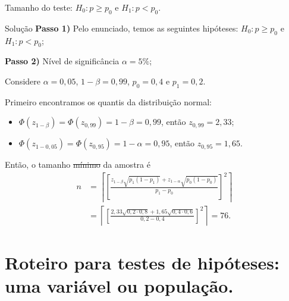 \documentclass[8pt]{beamer}
\begin{document}
\begin{frame}{Tamanho do teste: $H_0: p \geq p_0$ e $H_1: p < p_0$.}

\begin{block}{Solução}
	\textbf{Passo 1)}  Pelo enunciado, temos as seguintes hipóteses: $H_0: p \geq p_0$ e $H_1: p < p_0$;

	\textbf{Passo 2)} Nível de significância $\alpha=5\%$;

	Considere $\alpha=0,05$, $1-\beta=0,99$, $p_0 = 0,4$ e $p_1=0,2$. 
	
	Primeiro encontramos os quantis da distribuição normal:
	\begin{itemize}
		\item $\Phi\left( z_{1-\beta} \right) = \Phi\left( z_{0,99} \right) = 1-\beta = 0,99$, então $z_{0,99} = 2,33$;
		\item $\Phi\left( z_{1-0,05} \right) = \Phi\left( z_{0,95} \right) = 1-\alpha = 0,95$, então $z_{0,95} = 1,65$.
	\end{itemize}
	Então, o tamanho \sout{mínimo} da amostra é 
	\begin{align*}
		n &= \left\lceil \left[ \frac{ z_{1-\beta}\sqrt{p_1(1 - p_1)} + z_{1-\alpha}\sqrt{p_0(1 - p_0)}}{p_1-p_0} \right]^2 \right\rceil\\
		&= \left\lceil \left[ \frac{ 2,33 \sqrt{0,2 \cdot 0,8} + 1,65 \sqrt{0,4 \cdot 0,6} }{0,2 - 0,4}  \right]^2 \right\rceil = 76.
	\end{align*}

\end{block}
\end{frame}

\section{Roteiro para testes de hipóteses: uma variável ou população.}
\end{document}

